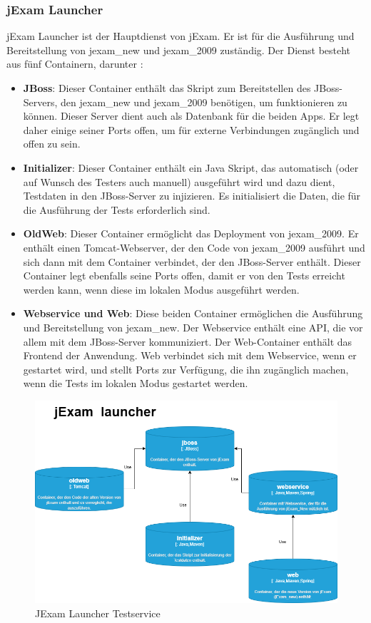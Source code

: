 \subsubsection{jExam Launcher}

jExam Launcher ist der Hauptdienst von jExam. Er ist für die Ausführung
und Bereitstellung von \gls{jexam_new} und \gls{jexam_2009} zuständig. Der Dienst
besteht aus fünf Containern, darunter :

\begin{itemize}
    \setlength\itemsep{1em}

    \item[] \textbf{JBoss}: Dieser Container enthält das Skript zum
    Bereitstellen des JBoss-Servers, den \gls{jexam_new} und \gls{jexam_2009}
    benötigen, um funktionieren zu können. Dieser Server dient auch
    als Datenbank für die beiden Apps. Er legt daher einige seiner
    Ports offen, um für externe Verbindungen zugänglich und offen
    zu sein.

    \item[] \textbf{Initializer}: Dieser Container enthält ein
    Java Skript, das automatisch (oder auf Wunsch des Testers auch
    manuell) ausgeführt wird und dazu dient, Testdaten in den 
    JBoss-Server zu injizieren. Es initialisiert die Daten, die für
    die Ausführung der Tests erforderlich sind.

    \item[] \textbf{OldWeb}: Dieser Container ermöglicht das
    Deployment von \gls{jexam_2009}. Er enthält einen Tomcat-Webserver,
    der den Code von \gls{jexam_2009} ausführt und sich dann mit
    dem Container verbindet, der den JBoss-Server enthält.
    Dieser Container legt ebenfalls seine Ports offen, damit er
    von den Tests erreicht werden kann, wenn diese im lokalen 
    Modus ausgeführt werden.

    \item[] \textbf{Webservice und Web}: Diese beiden Container
    ermöglichen die Ausführung und Bereitstellung von
    \gls{jexam_new}. Der Webservice enthält eine API, die vor
    allem mit dem JBoss-Server kommuniziert. Der Web-Container
    enthält das Frontend der Anwendung. Web verbindet sich mit
    dem Webservice, wenn er gestartet wird, und stellt Ports zur
    Verfügung, die ihn zugänglich machen, wenn die Tests im
    lokalen Modus gestartet werden.
\end{itemize}

\begin{figure}[H]
    \centering
    \includegraphics[scale=0.6]{images/launcher.drawio}
    \caption{JExam Launcher Testservice} \label{fig:laucher}
\end{figure}